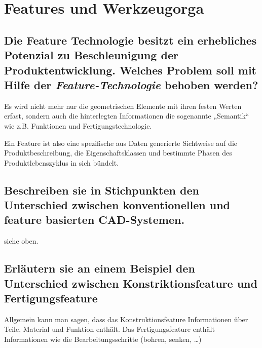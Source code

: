 \newpage

\section{Features und Werkzeugorga}

\subsection*{%
    Die Feature Technologie besitzt ein erhebliches Potenzial zu Beschleunigung
    der Produktentwicklung. Welches Problem soll mit Hilfe der
    \emph{Feature-Technologie} behoben werden?
}

Es wird nicht mehr nur die geometrischen Elemente mit ihren festen Werten
erfast, sondern auch die hinterlegten Informationen die sogenannte „Semantik“
wie z.\.B. Funktionen und Fertigungstechnologie.

Ein Feature ist also eine spezifische aus Daten generierte Sichtweise auf die
Produktbeschreibung, die Eigenschaftsklassen und bestimmte Phasen des
Produktlebenszyklus in sich bündelt.

\subsection*{%
    Beschreiben sie in Stichpunkten den Unterschied zwischen \glqq
    konventionellen\grqq {} und feature basierten CAD-Systemen.
}

siehe oben.

\subsection*{%
    Erläutern sie an einem Beispiel den Unterschied zwischen \glqq
    Konstriktionsfeature\grqq {} und \glqq Fertigungsfeature\grqq
}

Allgemein kann man sagen, dass das Konstruktionsfeature Informationen über
Teile, Material und Funktion enthält. Das Fertigungsfeature enthält
Informationen wie die Bearbeitungsschritte (bohren, senken, …)

